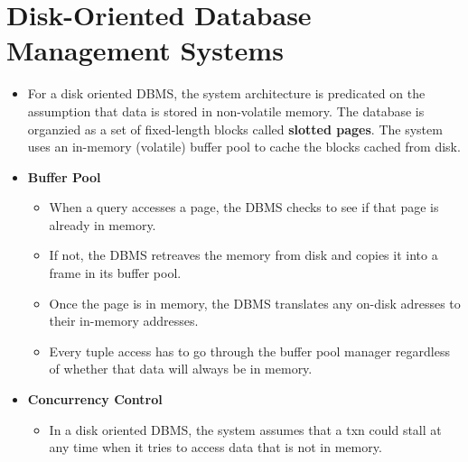 \documentclass[11pt]{article}
\begin{document}
\section{Disk-Oriented Database Management Systems}
\begin{itemize}
    \item
    For a disk oriented DBMS, the system architecture is predicated on the assumption that data 
    is stored in non-volatile memory.
    The database is organzied as a set of fixed-length blocks called \textbf{slotted pages}.
    The system uses an in-memory (volatile) buffer pool to cache the blocks cached from disk.
    
    \item \textbf{Buffer Pool}
    \begin{itemize}
        \item
        When a query accesses a page, the DBMS checks to see if that page is already in memory.
        
        \item
        If not, the DBMS retreaves the memory from disk and copies it into a frame in its 
        buffer pool.
        
        \item
        Once the page is in memory, the DBMS translates any on-disk adresses to their 
        in-memory addresses.
        
        \item
        Every tuple access has to go through the buffer pool manager regardless of whether 
        that data will always be in memory.
    \end{itemize}
    
    \item \textbf{Concurrency Control}
    \begin{itemize}
        \item
        In a disk oriented DBMS, the system assumes that a txn could stall at any time when it 
        tries to access data that is not in memory.
        

\end{itemize}
\end{itemize}
\end{document}
